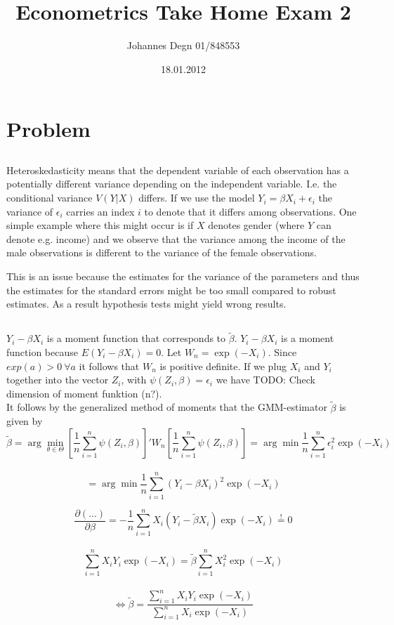 \documentclass[11pt]{article}
\title{\textbf{Econometrics Take Home Exam 2}}
\author{Johannes Degn 01/848553}
\date{18.01.2012}
\theoremstyle{break}
\begin{document}
\maketitle


\section{Problem}
\subsection{}
Heteroskedasticity means that the dependent variable of each observation has a potentially different variance depending on the independent variable. I.e. the conditional variance $V(Y|X)$ differs. If we use the model $Y_i = \beta X_i + \epsilon_i$ the variance of $\epsilon_i$ carries an index $i$ to denote that it differs among observations. One simple example where this might occur is if $X$ denotes gender (where $Y$ can denote e.g. income) and we observe that the variance among the income of the male observations is different to the variance of the female observations.

This is an issue because the estimates for the variance of the parameters and thus the estimates for the standard errors might be too small compared to robust estimates. As a result hypothesis tests might yield wrong results.
\subsection{}
$Y_i - \beta X_i$ is a moment function that corresponds to $\tilde{\beta}$. $Y_i - \beta X_i$ is a moment function because $E(Y_i - \beta X_i) = 0$. Let $W_n = \exp(-X_i)$. Since $exp(a) > 0 \ \forall a$ it follows that $W_n$ is positive definite. If we plug $X_i$ and $Y_i$ together into the vector $Z_i$, with $\psi(Z_i, \beta) = \epsilon_i$ we have TODO: Check dimension of moment funktion (n?).
\\
It follows by the generalized method of moments that the GMM-estimator $\tilde{\beta}$ is given by 
$$\tilde{\beta} = \displaystyle \arg \min_{\theta \in \Theta} [\frac{1}{n} \displaystyle \sum_{i=1}^n \psi(Z_i, \beta)]'W_n[\frac{1}{n} \displaystyle \sum_{i=1}^n \psi(Z_i, \beta)] = \arg \min \frac{1}{n} \displaystyle \sum_{i=1}^n \epsilon_i^2\exp(-X_i)$$ \\$$= \arg \min \frac{1}{n} \displaystyle \sum_{i=1}^n (Y_i-\beta X_i)^2\exp(-X_i)$$

$$\frac{\partial (...)}{\partial \beta} = -\frac{1}{n} \displaystyle \sum_{i=1}^n X_i(Y_i-\tilde{\beta} X_i)\exp(-X_i)\stackrel{!}{=}0$$ \\
$$\displaystyle \sum_{i=1}^nX_iY_i\exp(-X_i) = \tilde{\beta} \displaystyle \sum_{i=1}^nX_i^2\exp(-X_i)$$ \\
$$\Leftrightarrow \tilde{\beta} = \frac{\displaystyle \sum_{i=1}^n X_iY_i\exp(-X_i)}{\displaystyle \sum_{i=1}^nX_i\exp(-X_i)}$$
\end{document}
